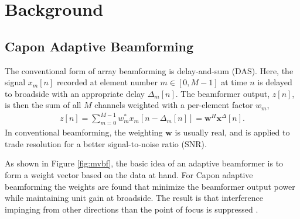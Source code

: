 \documentclass[conference]{IEEEtran}
\newcommand{\mat}[1]{\mathbf{#1}}
\renewcommand{\vec}[1]{\mathbf{#1}}
\begin{document}
\section{Background}
\subsection{Capon Adaptive Beamforming}
The conventional form of array beamforming is delay-and-sum (DAS). Here, the signal $x_m[n]$ recorded at element number $m \in [0,M-1]$ at time $n$ is delayed to broadside with an appropriate delay $\Delta_m[n]$. The beamformer output, $z[n]$, is then the sum of all $M$ channels weighted with a per-element factor $w_m$,
\begin{align}
z[n] = \sum_{m = 0}^{M-1}w_m^*x_m[n - \Delta_m[n]] = \vec{w}^H\vec{x}^{\Delta}[n]. \label{eq:z}
\end{align}
In conventional beamforming, the weighting $\vec{w}$ is usually real, and is applied to trade resolution for a better signal-to-noise ratio (SNR).

As shown in Figure \ref{fig:mvbf}, the basic idea of an adaptive beamformer is to form a weight vector based on the data at hand.  For Capon adaptive beamforming the weights are found that minimize the beamformer output power while maintaining unit gain at broadside. The result is that interference impinging from other directions than the point of focus is suppressed \cite{Synnevag2007}.

\end{document}
